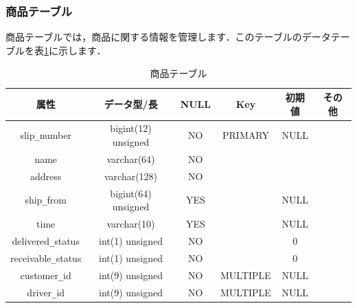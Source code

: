 \documentclass[a4j,titlepage]{jarticle}
\begin{document}
\subsubsection{商品テーブル}
商品テーブルでは，商品に関する情報を管理します．このテーブルのデータテーブルを表\ref{delivery}に示します．
\begin{table}[htb]
  \caption{商品テーブル}
  \label{delivery}
  \begin{center}
    \begin{tabular}{|c|c|c|c|c|c|} \hline
      属性 & データ型/長 & NULL & Key & 初期値 & その他 \\ \hline \hline
      slip\verb|_|number & bigint(12) unsigned & NO & PRIMARY & NULL & \\ \hline
      name & varchar(64) & NO &   &  & \\ \hline
      address & varchar(128) & NO &   &  & \\ \hline
      ship\verb|_|from & bigint(64) unsigned & YES &  & NULL & \\ \hline
      time & varchar(10) & YES &   & NULL & \\ \hline
      delivered\verb|_|status & int(1) unsigned & NO &   & 0 & \\ \hline
      receivable\verb|_|status & int(1) unsigned & NO &  & 0 & \\ \hline
      customer\verb|_|id & int(9) unsigned & NO & MULTIPLE & NULL & \\ \hline
      driver\verb|_|id & int(9) unsigned & NO & MULTIPLE & NULL & \\ \hline
    \end{tabular}
  \end{center}
\end{table}
\end{document}
